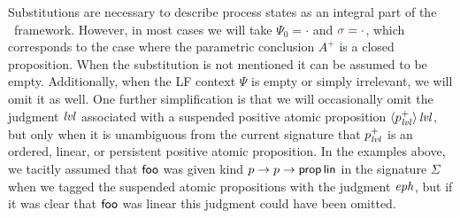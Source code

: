 Substitutions are necessary to describe process states as an
integral part of the \sls~framework. However, in most cases we
will take $\Psi_0 = \cdot$ and $\lf{\sigma} = \cdot$, which
corresponds to the case where the parametric conclusion $A^+$ is a
closed proposition. When the substitution is not mentioned it can be
assumed to be empty. Additionally, when the LF context $\Psi$ is empty
or simply irrelevant, we will omit it as well. One further
simplification is that we will occasionally omit the judgment ${\it lvl}$
associated with a suspended positive atomic proposition
${\langle {p^+_{\it lvl}} \rangle}\,{{\it lvl}}$, but only when it is unambiguous from the
current signature that $p^+_{\it lvl}$ is an ordered, linear, or
persistent positive atomic proposition. In the examples above, we
tacitly assumed that ${\sf foo}$ was given kind $p \rightarrow p
\rightarrow {\sf prop}\,{\sf lin}$ in the signature $\Sigma$ when we
tagged the suspended atomic propositions with the judgment ${\it eph}$, but if
it was clear that ${\sf foo}$ was linear this judgment
could have been omitted. 


